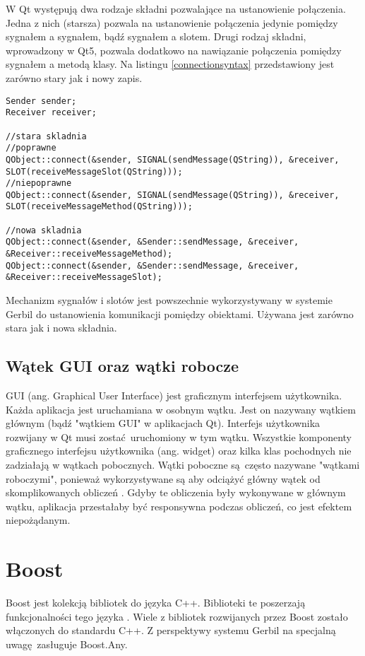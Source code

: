 W Qt występują dwa rodzaje składni pozwalające na ustanowienie połączenia. Jedna z nich (starsza) pozwala na ustanowienie połączenia jedynie pomiędzy sygnałem a sygnałem, bądź sygnałem a slotem. Drugi rodzaj składni, wprowadzony w Qt5, pozwala dodatkowo na nawiązanie połączenia pomiędzy sygnałem a metodą klasy. Na listingu \ref{connectionsyntax} przedstawiony jest zarówno stary jak i nowy zapis.

\begin{minipage}{\textwidth}
	\begin{lstlisting}[label=connectionsyntax, caption={Składnia tworzenia połączeń między obiektami},alsoletter={()[].=}]
Sender sender;
Receiver receiver;

//stara skladnia
//poprawne
QObject::connect(&sender, SIGNAL(sendMessage(QString)), &receiver, SLOT(receiveMessageSlot(QString)));
//niepoprawne
QObject::connect(&sender, SIGNAL(sendMessage(QString)), &receiver, SLOT(receiveMessageMethod(QString)));

//nowa skladnia
QObject::connect(&sender, &Sender::sendMessage, &receiver, &Receiver::receiveMessageMethod);
QObject::connect(&sender, &Sender::sendMessage, &receiver, &Receiver::receiveMessageSlot);
	\end{lstlisting}
\end{minipage}

Mechanizm sygnałów i slotów jest powszechnie wykorzystywany w systemie Gerbil do ustanowienia komunikacji pomiędzy obiektami. Używana jest zarówno stara jak i nowa składnia.

\subsection{Wątek GUI oraz wątki robocze}
GUI (ang. Graphical User Interface) jest graficznym interfejsem użytkownika. Każda aplikacja jest uruchamiana w osobnym wątku. Jest on nazywany wątkiem głównym (bądź "wątkiem GUI" w aplikacjach Qt). Interfejs użytkownika rozwijany w Qt musi zostać uruchomiony w tym wątku. Wszystkie komponenty graficznego interfejsu użytkownika (ang. widget) oraz kilka klas pochodnych nie zadziałają w wątkach pobocznych. Wątki poboczne są często nazywane "wątkami roboczymi", ponieważ wykorzystywane są aby odciążyć główny wątek od skomplikowanych obliczeń \cite{Qtdoc}. Gdyby te obliczenia były wykonywane w głównym wątku, aplikacja przestałaby być responsywna podczas obliczeń, co jest efektem niepożądanym.

 \section{Boost}
Boost jest kolekcją bibliotek do języka C++. Biblioteki te poszerzają funkcjonalności tego języka \cite{boost}. Wiele z bibliotek rozwijanych przez Boost zostało włączonych do standardu C++. Z perspektywy systemu Gerbil na specjalną uwagę zasługuje Boost.Any.



